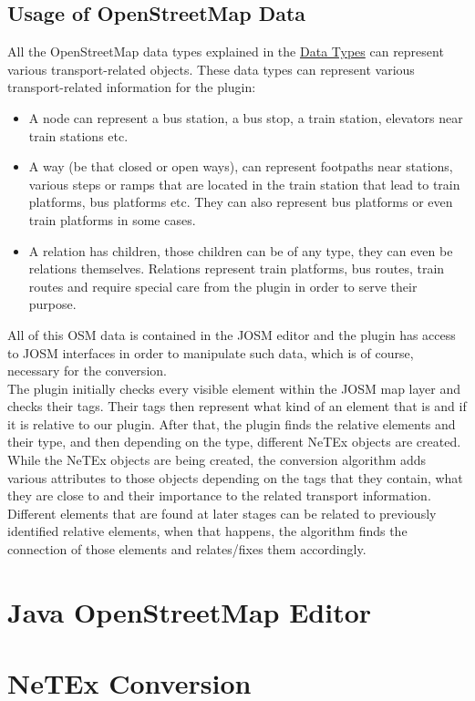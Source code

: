 \subsection{Usage of OpenStreetMap Data}
All the OpenStreetMap data types explained in the \hyperref[sec:OSMDataTypes]{Data Types} can represent various transport-related objects. These data types can represent various transport-related information for the plugin:
\begin{itemize}
	\item {A node can represent a bus station, a bus stop, a train station, elevators near train stations etc. }
	\item {A way (be that closed or open ways), can represent footpaths near stations, various steps or ramps that are located in the train station that lead to train platforms, bus platforms etc. They can also represent bus platforms or even train platforms in some cases.}
	\item {A relation has children, those children can be of any type, they can even be relations themselves. Relations represent train platforms, bus routes, train routes and require special care from the plugin in order to serve their purpose.}
\end{itemize}
All of this OSM data is contained in the JOSM editor and the plugin has access to JOSM interfaces in order to manipulate such data, which is of course, necessary for the conversion.\\
The plugin initially checks every visible element within the JOSM map layer and checks their tags. Their tags then represent what kind of an element that is and if it is relative to our plugin. After that, the plugin finds the relative elements and their type, and then depending on the type, different NeTEx objects are created. While the NeTEx objects are being created, the conversion algorithm adds various attributes to those objects depending on the tags that they contain, what they are close to and their importance to the related transport information. Different elements that are found at later stages can be related to previously identified relative elements, when that happens, the algorithm finds the connection of those elements and relates/fixes them accordingly.
\section{Java OpenStreetMap Editor}
\lipsum[4-6]
\section{NeTEx Conversion}
\lipsum[10-13]
